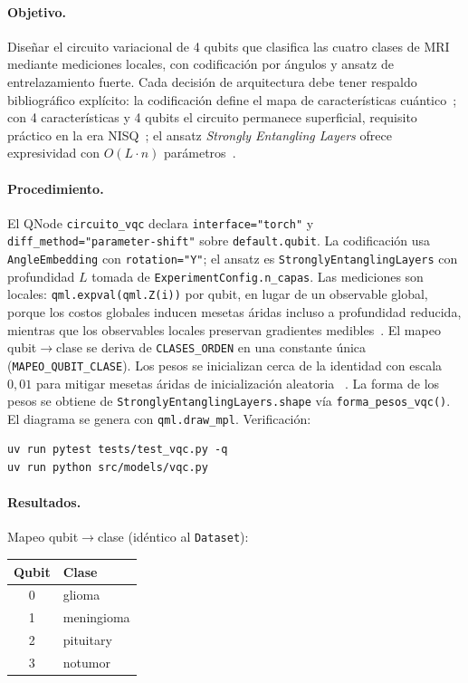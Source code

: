 \paragraph{Objetivo.}
Diseñar el circuito variacional de 4 qubits que clasifica las cuatro clases de MRI
mediante mediciones locales, con codificación por ángulos y ansatz de entrelazamiento
fuerte. Cada decisión de arquitectura debe tener respaldo bibliográfico explícito: la
codificación define el mapa de características cuántico~\cite{schuld2019feature}; con
4 características y 4 qubits el circuito permanece superficial, requisito práctico en
la era NISQ~\cite{Preskill2018}; el ansatz \textit{Strongly Entangling Layers} ofrece
expresividad con $O(L \cdot n)$ parámetros~\cite{schuld2020circuit}.

\paragraph{Procedimiento.}
El QNode \texttt{circuito\_vqc} declara \texttt{interface="torch"} y
\texttt{diff\_method="parameter-shift"} sobre \texttt{default.qubit}. La codificación
usa \texttt{AngleEmbedding} con \texttt{rotation="Y"}; el ansatz es
\texttt{StronglyEntanglingLayers} con profundidad $L$ tomada de
\texttt{ExperimentConfig.n\_capas}. Las mediciones son locales:
\texttt{qml.expval(qml.Z(i))} por qubit, en lugar de un observable global, porque los
costos globales inducen mesetas áridas incluso a profundidad reducida, mientras que
los observables locales preservan gradientes medibles~\cite{Cerezo2021bp}. El mapeo
qubit$\rightarrow$clase se deriva de \texttt{CLASES\_ORDEN} en una constante única
(\texttt{MAPEO\_QUBIT\_CLASE}). Los pesos se inicializan cerca de la identidad con
escala $0{,}01$ para mitigar mesetas áridas de inicialización aleatoria
~\cite{McClean2018B, grant2019initialization}. La forma de los pesos se obtiene
de \texttt{StronglyEntanglingLayers.shape} vía \texttt{forma\_pesos\_vqc()}. El
diagrama se genera con \texttt{qml.draw\_mpl}. Verificación:
\begin{verbatim}
uv run pytest tests/test_vqc.py -q
uv run python src/models/vqc.py
\end{verbatim}

\paragraph{Resultados.}
Mapeo qubit$\rightarrow$clase (idéntico al \texttt{Dataset}):

\begin{center}
\small
\begin{tabular}{cl}\hline
\textbf{Qubit} & \textbf{Clase} \\\hline
0 & glioma \\
1 & meningioma \\
2 & pituitary \\
3 & notumor \\\hline
\end{tabular}
\end{center}

